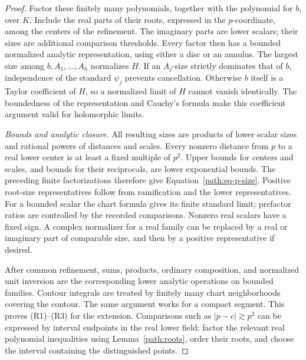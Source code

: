 \begin{proof}
Factor these finitely many polynomials, together with the polynomial
for \(b\), over \(K\).  Include the real parts of their roots, expressed
in the \(p\)-coordinate, among the centers of the refinement.  The
imaginary parts are lower scalars; their sizes are additional comparison
thresholds.  Every factor then has a bounded normalized analytic
representation, using either a disc or an annulus.  The largest size
among \(b,A_1,\ldots,A_h\) normalizes \(H\).  If an \(A_j\)-size
strictly dominates that of \(b\), independence of the standard
\(\psi_j\) prevents cancellation.  Otherwise \(b\) itself is a
Taylor coefficient of \(H\), so a normalized limit of \(H\) cannot
vanish identically.  The boundedness of the representation and Cauchy's
formula make this coefficient argument valid for holomorphic limits.

\emph{Bounds and analytic closure.}
All resulting sizes are products of lower scalar sizes and rational
powers of distances and scales.  Every nonzero distance from \(p\)
to a real lower center is at least a fixed multiple of \(p^2\).
Upper bounds for centers and scales, and bounds for their reciprocals,
are lower exponential bounds.  The preceding finite factorizations
therefore give Equation~\eqref{path:eq-p-size}.  Positive root-size
representatives follow from ramification and the lower representatives.
For a bounded scalar the chart formula gives its finite standard
limit; prefactor ratios are controlled by the recorded comparisons.
Nonzero real scalars have a fixed sign.  A complex normalizer for a real
family can be replaced by a real or imaginary part of comparable size,
and then by a positive representative if desired.

After common refinement, sums, products, ordinary composition, and
normalized unit inversion are the corresponding lower analytic
operations on bounded families.  Contour integrals are treated by
finitely many chart neighborhoods covering the contour.  The same
argument works for a compact segment.  This proves
\textup{(R1)--(R3)} for the extension.  Comparisons such as
\(|p-c|\gtrsim p^2\) can be expressed by interval endpoints in the
real lower field: factor the relevant real polynomial inequalities
using Lemma~\ref{path:roots}, order their roots, and choose the interval
containing the distinguished points.


\end{proof}
